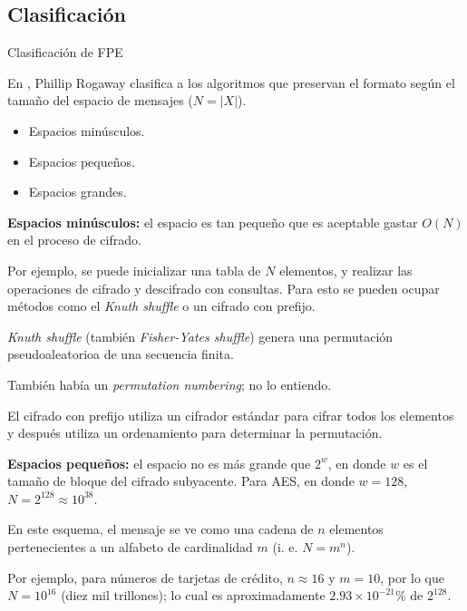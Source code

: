 %
%

\subsection{Clasificación}

\begin{frame}{Clasificación de FPE}

  En \cite{sinopsis_rogaway}, Phillip Rogaway clasifica a los algoritmos que
  preservan el formato según el tamaño del espacio de mensajes ($ N = |X| $).

  \begin{itemize}
    \item Espacios minúsculos.
    \item Espacios pequeños.
    \item Espacios grandes.
  \end{itemize}

  {
    \textbf{Espacios minúsculos:} el espacio es tan pequeño que es aceptable
    gastar $ O(N) $ en el proceso de cifrado.

    Por ejemplo, se puede inicializar una tabla de $ N $ elementos, y realizar
    las operaciones de cifrado y descifrado con consultas. Para esto se pueden
    ocupar métodos como el \textit{Knuth shuffle} o un cifrado con prefijo.
  }

  {
    \textit{Knuth shuffle} (también \textit{Fisher-Yates shuffle}) genera una
    permutación pseudoaleatorioa de una secuencia finita.

    También había un \textit{permutation numbering}; no lo entiendo.

    El cifrado con prefijo utiliza un cifrador estándar para cifrar todos los
    elementos y después utiliza un ordenamiento para determinar la permutación.
  }

  {
    \textbf{Espacios pequeños:} el espacio no es más grande que $ 2^w $, en
    donde $ w $ es el tamaño de bloque del cifrado subyacente. Para AES, en
    donde $ w = 128 $, $ N = 2^{128} \approx 10^{38} $.

    En este esquema, el mensaje se ve como una cadena de $ n $ elementos
    pertenecientes a un alfabeto de cardinalidad $ m $ (i. e. $ N = m^n $).

    Por ejemplo, para números de tarjetas de crédito, $ n \approx 16 $ y
    $ m = 10 $, por lo que $ N = 10^{16} $ (diez mil trillones); lo cual es
    aproximadamente $ 2.93 \times 10^{-21} \% $ de $ 2^{128} $.
  }


\end{frame}
